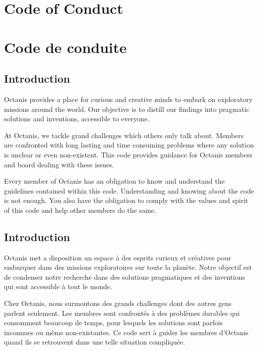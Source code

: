 
\renewcommand{\thesubsection}{\arabic{subsection}}

\english
	\section*{Code of Conduct}

\french
	\section*{Code de conduite}



\english
	\subsection{Introduction}
	{\semibold Octanis provides a place for curious and creative minds to embark on exploratory missions around the world. Our objective is to distill our findings into pragmatic solutions and inventions, accessible to everyone. }


	At Octanis, we tackle grand challenges which others only talk about. Members are confronted with long lasting and time consuming problems where any solution is unclear or even non-existent. This code provides guidance for Octanis members and board dealing with these issues.

	Every member of Octanis has an obligation to know and understand the guidelines contained within this code.
	Understanding and knowing about the code is not enough. You also have the obligation to comply with the values and spirit of this code and help other members do the same.

\french
	\subsection{Introduction}
	{\semibold Octanis met a disposition un espace à des esprits curieux et créatives pour embarquer dans des missions exploratoires sur toute la planète. Notre objectif est de condenser notre recherche dans des solutions pragmatiques et des inventions qui sont accessible à tout le monde. }


	Chez Octanis, nous surmontons des grands challenges dont des autres gens parlent seulement. Les membres sont confrontés à des problèmes durables qui consomment beaucoup de temps, pour lesquels les solutions sont parfois inconnues ou même non-existantes. Ce code sert à guider les membres d'Octanis quand ils se retrouvent dans une telle situation compliquée. 

